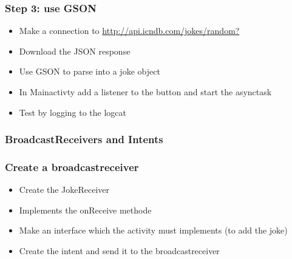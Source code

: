 \documentclass{beamer}
\begin{document}
\begin{frame}
	\frametitle{Step 3: use GSON}
	
	\begin{itemize}
		\item Make a connection to \url{http://api.icndb.com/jokes/random?}
		\item Download the JSON response
		\item Use GSON to parse into a joke object
		\item In Mainactivty add a listener to the button and start the asynctask
		\item Test by logging to the logcat
	\end{itemize}
\end{frame}


\begin{frame}
	\frametitle{BroadcastReceivers and Intents}
	
	
\end{frame}

{
	\begin{frame}[plain]
	\end{frame}
}

\begin{frame}
	\frametitle{Create a broadcastreceiver}
	
	\begin{itemize}
		\item Create the JokeReceiver
		\item Implements the onReceive methode
		\item Make an interface which the activity must implements (to add the joke)
		\item Create the intent and send it to the broadcastreceiver
	\end{itemize}
\end{frame}
\end{document}
